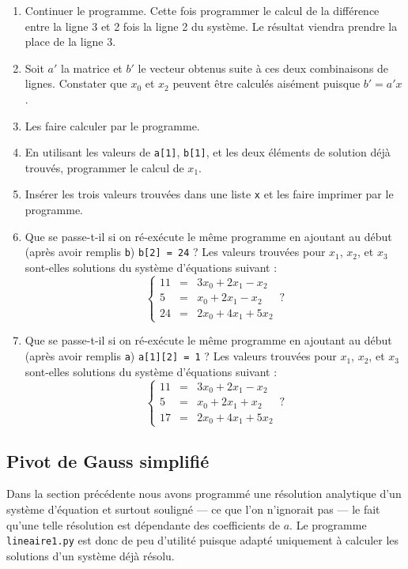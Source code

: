 \begin{enumerate}
   \begin{enumerate}
   \item Continuer le programme. Cette fois programmer le calcul de la différence
     entre la ligne 3 et 2 fois la ligne 2 du système. Le résultat viendra prendre la
     place de la ligne 3.
   \item Soit $a'$ la matrice et $b'$ le vecteur obtenus suite à ces deux combinaisons de lignes.
     Constater que $x_0$ et $x_2$ peuvent être calculés aisément puisque $b'=a'x$.
   \item Les faire calculer par le programme.
   \item En utilisant les valeurs de \verb+a[1]+, \verb+b[1]+, et les deux éléments de solution
     déjà trouvés, programmer le calcul de $x_1$.
   \item Insérer les trois valeurs trouvées dans une liste \verb+x+ et les faire imprimer par le programme.
     
  \item Que se passe-t-il si on ré-exécute le même programme en ajoutant au début
     (après avoir remplis \verb+b+) \verb+b[2] = 24+ ? Les valeurs trouvées pour $x_1$, $x_2$, et $x_3$
     sont-elles solutions du système d'équations suivant :
     \[
       \left\{
         \begin{array}{rcl}
           11 & = & 3x_0 + 2x_1 -x_2 \\
           5  & = & x_0 + 2x_1 -x_2 \\
           24 & = & 2x_0+4x_1 + 5x_2
         \end{array}
       \right. \,?
     \]    
  
   \item Que se passe-t-il si on ré-exécute le même programme en ajoutant au début
     (après avoir remplis \verb+a+) \verb+a[1][2] = 1+ ? Les valeurs trouvées pour $x_1$, $x_2$, et $x_3$
     sont-elles solutions du système d'équations suivant :
     \[
       \left\{
         \begin{array}{rcl}
           11 & = & 3x_0 + 2x_1 -x_2 \\
           5  & = & x_0 + 2x_1 +x_2 \\
           17 & = & 2x_0+4x_1 + 5x_2
         \end{array}
       \right. \,?
     \]    
     
   \end{enumerate}
 \end{enumerate}

 \subsection{Pivot de Gauss simplifié}
 Dans la section précédente nous avons programmé une résolution
 analytique d'un système d'équation et surtout souligné ---
 ce que l'on n'ignorait pas --- le fait
 qu'une telle résolution est dépendante des coefficients de $a$.
 Le programme \verb+lineaire1.py+ est donc de peu d'utilité puisque
 adapté uniquement à calculer les solutions d'un système déjà résolu.

